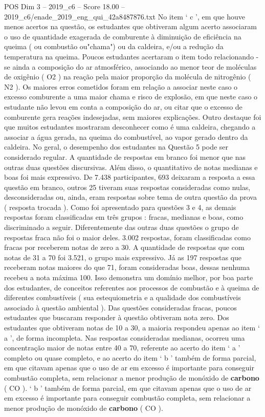 \begin{textsample}{POS Dim 3 – 2019\_c6 – Score 18.00 – 2019\_c6/enade\_2019\_eng\_qui\_42a8487876.txt}
No item ‘ c ’, em que houve menos acertos na questão, os estudantes que obtiveram algum acerto associaram o uso de quantidade exagerada de comburente à diminuição de eficiência na queima ( ou combustão ou"chama") ou da caldeira, e/ou a redução da temperatura na queima.
Poucos estudantes acertaram o item todo relacionando -se ainda a composição do ar atmosférico, associando ao menor teor de moléculas de oxigênio ( O2 ) na reação pela maior proporção da molécula de nitrogênio ( N2 ).
Os maiores erros cometidos foram em relação a associar neste caso o excesso comburente a uma maior chama e risco de explosão, em que neste caso o estudante não levou em conta a composição do ar, ou citar que o excesso de comburente gera reações indesejadas, sem maiores explicações.
Outro destaque foi que muitos estudantes mostraram desconhecer como é uma caldeira, chegando a associar a água gerada, na queima do combustível, ao vapor gerado dentro da caldeira.
No geral, o desempenho dos estudantes na Questão 5 pode ser considerado regular.
A quantidade de respostas em branco foi menor que nas outras duas questões discursivas.
Além disso, o quantitativo de notas medianas e boas foi mais expressivo.
De 7.438 participantes, 693 deixaram a resposta a essa questão em branco, outros 25 tiveram suas respostas consideradas como nulas, desconsideradas ou, ainda, eram respostas sobre tema de outra questão da prova ( resposta trocada ).
Como foi apresentado para questões 3 e 4, as demais respostas foram classificadas em três grupos : fracas, medianas e boas, como discriminado a seguir.
Diferentemente das outras duas questões o grupo de respostas fraca não foi o maior deles. 3.002 respostas, foram classificadas como fracas por receberem notas de zero a 30.
A quantidade de respostas que com notas de 31 a 70 foi 3.521, o grupo mais expressivo.
Já as 197 respostas que receberam notas maiores do que 71, foram consideradas boas, dessas nenhuma recebeu a nota máxima 100.
Isso demonstra um domínio melhor, por boa parte dos estudantes, de conceitos referentes aos processos de combustão e à queima de diferentes combustíveis ( sua estequiometria e a qualidade dos combustíveis associado à questão ambiental ).
Das questões consideradas fracas, poucos estudantes que buscaram responder à questão obtiveram nota zero.
Dos estudantes que obtiveram notas de 10 a 30, a maioria respondeu apenas ao item ‘ a ’, de forma incompleta.
Nas respostas consideradas medianas, ocorreu uma concentração maior de notas entre 40 a 70, referente ao acerto do item ‘ a ’ completo ou quase completo, e ao acerto do item ‘ b ’ também de forma parcial, em que citavam apenas que o uso de ar em excesso é importante para conseguir combustão completa, sem relacionar a menor produção de monóxido de \textbf{carbono} ( CO ). ‘ b ’ também de forma parcial, em que citavam apenas que o uso de ar em excesso é importante para conseguir combustão completa, sem relacionar a menor produção de monóxido de \textbf{carbono} ( CO ).

\end{textsample}
